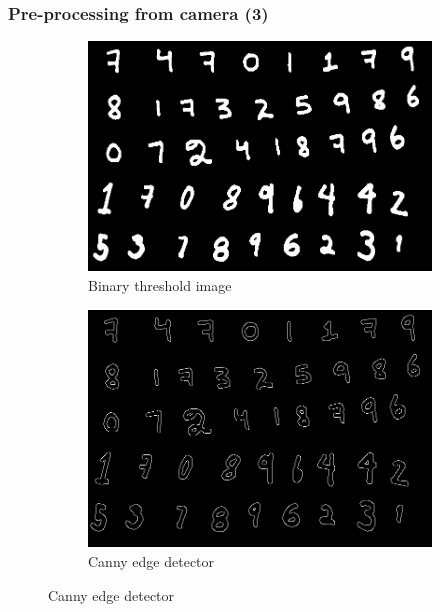 \documentclass[11.5pt,aspectratio=1610,xcolor={usenames,dvipsnames,table}]{beamer}
\begin{document}
\begin{frame}
\frametitle{Pre-processing from camera (3)}

\begin{figure}[H]
	

	\centering
	\begin{subfigure}{0.4\textwidth}
	\includegraphics[width=0.8 \textwidth]{images/thresh.png}
	\caption{Binary threshold image}
	\end{subfigure}
	
	\begin{subfigure}{0.4\textwidth}
		\includegraphics[width=0.8 \textwidth]{images/edge.png}
		\caption{Canny edge detector}
	\end{subfigure}
	
\end{figure}

\end{frame}
\end{document}
